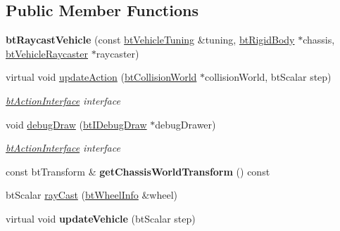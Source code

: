 \subsection*{Public Member Functions}
\begin{DoxyCompactItemize}
\item 
\mbox{\label{classbtRaycastVehicle_a7dd285cde99f2fb2b6c6a38ff4e4e151}} 
{\bfseries bt\+Raycast\+Vehicle} (const \hyperlink{classbtRaycastVehicle_1_1btVehicleTuning}{bt\+Vehicle\+Tuning} \&tuning, \hyperlink{classbtRigidBody}{bt\+Rigid\+Body} $\ast$chassis, \hyperlink{structbtVehicleRaycaster}{bt\+Vehicle\+Raycaster} $\ast$raycaster)
\item 
\mbox{\label{classbtRaycastVehicle_a22d127e6b87137131485cdebd65ea5af}} 
virtual void \hyperlink{classbtRaycastVehicle_a22d127e6b87137131485cdebd65ea5af}{update\+Action} (\hyperlink{classbtCollisionWorld}{bt\+Collision\+World} $\ast$collision\+World, bt\+Scalar step)
\begin{DoxyCompactList}\small\item\em \hyperlink{classbtActionInterface}{bt\+Action\+Interface} interface \end{DoxyCompactList}\item 
\mbox{\label{classbtRaycastVehicle_ab5dfeb4a57f735f6fb069bfc5654428d}} 
void \hyperlink{classbtRaycastVehicle_ab5dfeb4a57f735f6fb069bfc5654428d}{debug\+Draw} (\hyperlink{classbtIDebugDraw}{bt\+I\+Debug\+Draw} $\ast$debug\+Drawer)
\begin{DoxyCompactList}\small\item\em \hyperlink{classbtActionInterface}{bt\+Action\+Interface} interface \end{DoxyCompactList}\item 
\mbox{\label{classbtRaycastVehicle_acb7cdc79f160663bc7b0122bae2f4090}} 
const bt\+Transform \& {\bfseries get\+Chassis\+World\+Transform} () const
\item 
bt\+Scalar \hyperlink{classbtRaycastVehicle_a53451c4e3495561f3f078b2041ef04be}{ray\+Cast} (\hyperlink{structbtWheelInfo}{bt\+Wheel\+Info} \&wheel)
\item 
\mbox{\label{classbtRaycastVehicle_a9c7597378358b8f4609aa87090116014}} 
virtual void {\bfseries update\+Vehicle} (bt\+Scalar step)

\end{DoxyCompactItemize}
